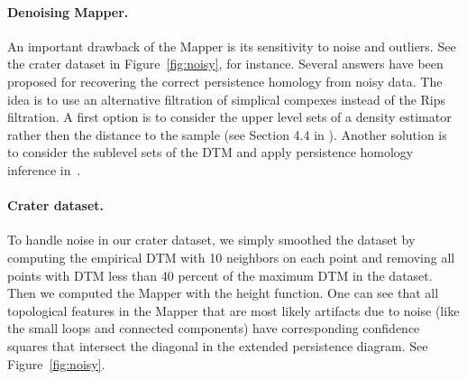 \paragraph{Denoising Mapper.}
An important drawback of the Mapper is its sensitivity to noise and outliers.
See the crater dataset in Figure~\ref{fig:noisy}, for instance.
Several answers have been proposed for recovering the correct persistence homology from noisy data. 
The idea is to use an alternative filtration of simplical compexes instead of the Rips filtration. 
A first option is to consider the upper level sets of a density estimator rather then the 
distance to the sample (see Section  4.4 in \cite{Fasy14}). Another solution is to 
consider the sublevel sets of the DTM
and apply persistence homology inference in~\cite{Chazal14b}. 

\paragraph{Crater dataset.} To handle noise in our crater dataset, we simply smoothed the dataset by computing the empirical DTM with 10 neighbors on each point
and removing all points with DTM less than 40 percent of the maximum DTM in the dataset. Then we computed the Mapper with the height function.
One can see that all topological features in the Mapper that are most likely artifacts due to noise (like the small loops and connected components)
have corresponding confidence squares that intersect the diagonal in the extended persistence diagram. See Figure~\ref{fig:noisy}.

